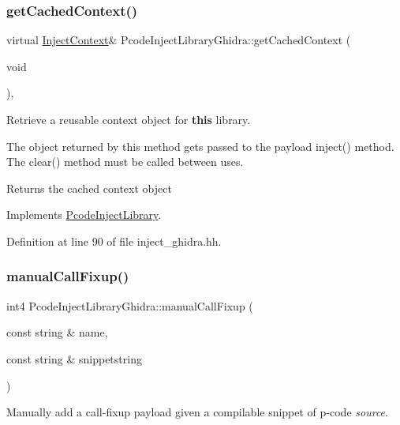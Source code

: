 \subsubsection{\texorpdfstring{getCachedContext()}{getCachedContext()}}
{\footnotesize\ttfamily virtual \mbox{\hyperlink{class_inject_context}{Inject\+Context}}\& Pcode\+Inject\+Library\+Ghidra\+::get\+Cached\+Context (\begin{DoxyParamCaption}\item[{void}]{ }\end{DoxyParamCaption})\hspace{0.3cm}{\ttfamily [inline]}, {\ttfamily [virtual]}}



Retrieve a reusable context object for {\bfseries{this}} library. 

The object returned by this method gets passed to the payload inject() method. The clear() method must be called between uses. \begin{DoxyReturn}{Returns}
the cached context object 
\end{DoxyReturn}


Implements \mbox{\hyperlink{class_pcode_inject_library_a3a1ca9f7ea2cea02de1141cc35c79b18}{Pcode\+Inject\+Library}}.



Definition at line 90 of file inject\+\_\+ghidra.\+hh.

\mbox{\label{class_pcode_inject_library_ghidra_a2e8265c935ddb94e4a2354706d823e14}} 
\subsubsection{\texorpdfstring{manualCallFixup()}{manualCallFixup()}}
{\footnotesize\ttfamily int4 Pcode\+Inject\+Library\+Ghidra\+::manual\+Call\+Fixup (\begin{DoxyParamCaption}\item[{const string \&}]{name,  }\item[{const string \&}]{snippetstring }\end{DoxyParamCaption})\hspace{0.3cm}{\ttfamily [virtual]}}



Manually add a call-\/fixup payload given a compilable snippet of p-\/code {\itshape source}. 

